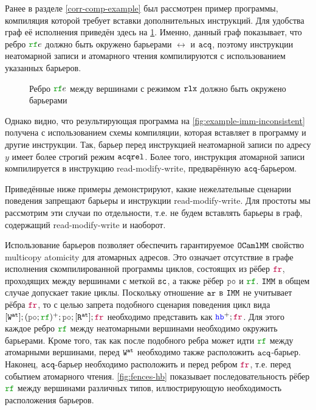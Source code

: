 Ранее в разделе \ref{corr-comp-example} был рассмотрен пример программы, компиляция которой требует вставки дополнительных инструкций. Для удобства граф её исполнения приведён здесь на \cref{fig:example-imm-inconsistent-copy}. Именно, данный граф показывает, что ребро $\lRF e$ должно быть окружено барьерами $\rel$ и ${\mathtt{acq}}$, поэтому инструкции неатомарной записи и атомарного чтения компилируются с использованием указанных барьеров.


\renewcommand{\hsIV}{2}
\begin{figure}[h]
  \centering
  \begin{minipage}{0.9\textwidth}
    \centering
  \end{minipage}
  \caption{Ребро $\lRF e$ между вершинами с режимом $\mathtt{rlx}$ должно быть окружено барьерами}
  \label{fig:example-imm-inconsistent-copy}
\end{figure}


Однако видно, что результирующая программа на \cref{fig:example-imm-inconsistent} получена с использованием схемы компиляции, которая вставляет в программу и другие инструкции. Так, барьер перед инструкцией неатомарной записи по адресу $y$ имеет более строгий режим ${\mathtt{acqrel}}$. Более того, инструкция атомарной записи компилируется в инструкцию read-modify-write, предварённую ${\mathtt{acq}}$-барьером.

Приведённые ниже примеры демонстрируют, какие нежелательные сценарии поведения запрещают барьеры и инструкции read-modify-write. Для простоты мы рассмотрим эти случаи по отдельности, т.е. не будем вставлять барьеры в граф, содержащий read-modify-write и наоборот. 

Использование барьеров позволяет обеспечить гарантируемое $\mathtt{OCaml}\allowbreak \mathtt{MM}$ свойство multicopy atomicity для атомарных адресов. Это означает отсутствие в графе исполнения скомпилированной программы циклов, состоящих из рёбер $\lFR$, проходящих между вершинами с меткой ${\mathtt{sc}}$, а также рёбер $\lPO$ и $\lRF$. $\mathtt{IMM}$ в общем случае допускает такие циклы. Поскольку отношение $\lAR$ в $\mathtt{IMM}$ не учитывает рёбра $\lFR$, то с целью запрета подобного сценария поведения цикл вида $[\lW^\at];(\lPO; \lRF)^{+};\lPO;[\lR^\at];\lFR$ необходимо представить как $\lHB^{+};\lFR$. Для этого каждое ребро $\lRF$ между неатомарными вершинами необходимо окружить барьерами. Кроме того, так как после подобного ребра может идти $\lRF$ между атомарными вершинами, перед ${\mathtt{W}}^{\mathtt{at}}$ необходимо также расположить ${\mathtt{acq}}$-барьер. Наконец, ${\mathtt{acq}}$-барьер необходимо расположить и перед ребром $\lFR$, т.е. перед событием атомарного чтения. \cref{fig:fences-hb} показывает последовательность рёбер $\lRF$ между вершинами различных типов, иллюстрирующую необходимость расположения барьеров. 

